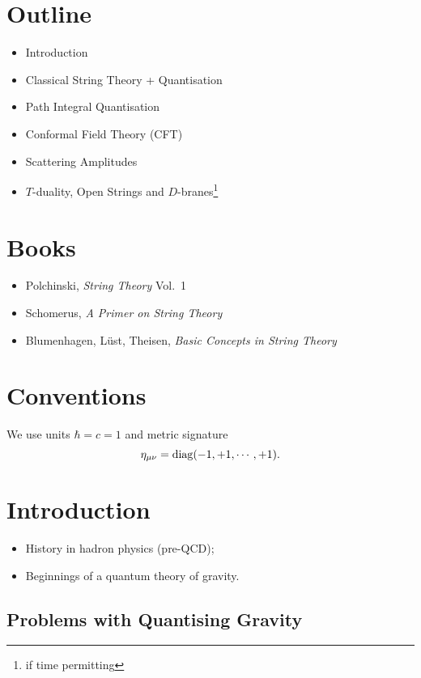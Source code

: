 \documentclass[a4paper,11pt]{article}
\begin{document}
	\newpage
	
	\section*{Outline}
	\begin{itemize}
		\item Introduction
		\item Classical String Theory + Quantisation
		\item Path Integral Quantisation
		\item Conformal Field Theory (CFT)
		\item Scattering Amplitudes
		\item $T$-duality, Open Strings and $D$-branes\footnote{if time permitting}
	\end{itemize}

	\section*{Books}
	\begin{itemize}
		\item Polchinski, \emph{String Theory} Vol.~1
		\item Schomerus, \emph{A Primer on String Theory}
		\item Blumenhagen, L\"ust, Theisen, \emph{Basic Concepts in String Theory}
	\end{itemize}

	\section*{Conventions}

	We use units $\hbar = c = 1$ and metric signature
	\[
		\eta _{\mu \nu} = \operatorname{diag}(-1, +1, \cdots, +1).
	\]
	\newpage

	\tableofcontents
	\newpage
	\maintext

	\section{Introduction}
	\begin{itemize}
		\item History in hadron physics (pre-QCD);
		\item Beginnings of a quantum theory of gravity.
	\end{itemize}
	\subsection{Problems with Quantising Gravity}
\end{document}
